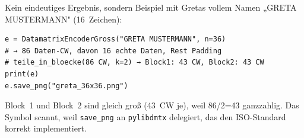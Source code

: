 Kein eindeutiges Ergebnis, sondern Beispiel mit Gretas vollem Namen
„GRETA MUSTERMANN" (16~Zeichen):

\begin{verbatim}
e = DatamatrixEncoderGross("GRETA MUSTERMANN", n=36)
# → 86 Daten-CW, davon 16 echte Daten, Rest Padding
# teile_in_bloecke(86 CW, k=2) → Block1: 43 CW, Block2: 43 CW
print(e)
e.save_png("greta_36x36.png")
\end{verbatim}

Block~1 und Block~2 sind gleich groß (43~CW je), weil 86/2=43 ganzzahlig.
Das Symbol scannt, weil \texttt{save\_png} an \texttt{pylibdmtx} delegiert,
das den ISO-Standard korrekt implementiert.
